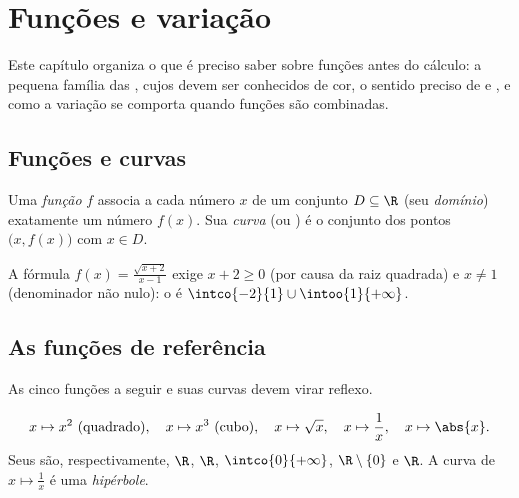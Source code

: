 \chapter{Funções e variação}\label{ch:g11:func}

Este capítulo organiza o que é preciso saber sobre funções antes do
cálculo: a pequena família das \emph{}, cujos
 devem ser conhecidos de cor, o sentido preciso de
\emph{} e \emph{}, e como a variação se comporta
quando funções são combinadas.

\section{Funções e curvas}

\begin{definition}\label{def:g11:func:function}
Uma \emph{função} $f$ associa a cada número $x$ de um
conjunto $D \subseteq \R$ (seu \emph{domínio}) exatamente
um número $f(x)$. Sua \emph{curva} (ou ) é o conjunto dos pontos
$\bigl(x, f(x)\bigr)$ com $x \in D$.
\end{definition}

\begin{example}
A fórmula $f(x) = \frac{\sqrt{x+2}}{x-1}$ exige $x + 2 \geq 0$ (por causa
da raiz quadrada) e $x \neq 1$ (denominador não nulo): o  é
$\intco{-2}{1} \cup \intoo{1}{+\infty}$.
\end{example}

\section{As funções de referência}

As cinco funções a seguir e suas curvas devem virar reflexo.

\begin{definition}\label{def:g11:func:reference}
\[
x \mapsto x^2 \text{ (quadrado)}, \quad
x \mapsto x^3 \text{ (cubo)}, \quad
x \mapsto \sqrt{x}, \quad
x \mapsto \frac{1}{x}, \quad
x \mapsto \abs{x}.
\]
Seus  são, respectivamente, $\R$, $\R$, $\intco{0}{+\infty}$,
$\R \setminus \{0\}$ e $\R$. A curva de $x \mapsto \frac1x$ é uma
\emph{hipérbole}.
\end{definition}

